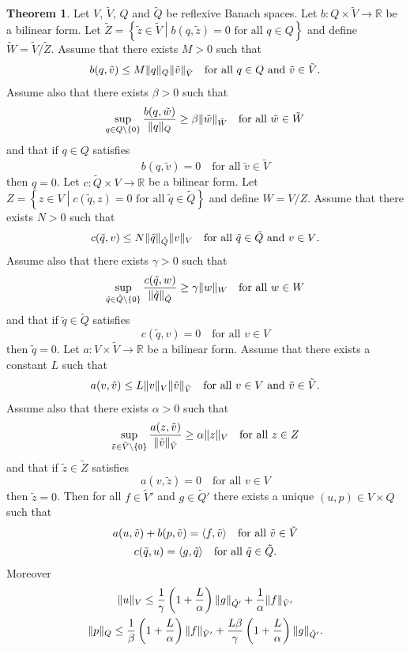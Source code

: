\documentclass[a4paper,10pt,oneside]{amsbook}
\numberwithin{section}{chapter}
\numberwithin{equation}{chapter}
\theoremstyle{definition}
\newtheorem{thm}[prop]{Theorem}
\DeclarePairedDelimiter{\norm}{\lVert}{\rVert}
\DeclarePairedDelimiter{\dual}{\langle}{\rangle}
\begin{document}
\begin{thm}
\label{thm:mixed-elliptic}
Let $V$, $\tilde V$, $Q$ and $\tilde Q$ be reflexive Banach spaces. Let $b\colon Q\times\tilde V\to\mathbb{R}$ be a bilinear form. Let $\tilde{Z}=\left\{\tilde{z}\in\tilde V\middle|\text{$b(q,\tilde z)=0$ for all $q\in Q$}\right\}$ and define $\tilde W=\tilde V/\tilde Z$. Assume that there exists $M>0$ such that
\[
b(q,\tilde v)\le M\norm{q}_Q\norm{\tilde v}_{\tilde V}\quad\text{for all $q\in Q$ and $\tilde v\in\tilde V$}.
\]
Assume also that there exists $\beta>0$ such that
\[
\sup_{q\in Q\setminus\{0\}}\frac{b(q,\tilde w)}{\norm{q}_Q}\ge\beta\norm{\tilde w}_{\tilde W}\quad\text{for all $\tilde w\in\tilde W$}
\]
and that if $q\in Q$ satisfies
\[
b(q,\tilde v)=0\quad\text{for all $\tilde v\in\tilde V$}
\]
then $q=0$. Let $c\colon\tilde Q\times V\to\mathbb{R}$ be a bilinear form. Let $Z=\left\{z\in V\middle|\text{$c(\tilde q,z)=0$ for all $\tilde q\in\tilde Q$}\right\}$ and define $W=V/Z$. Assume that there exists $N>0$ such that
\[
c(\tilde q,v)\le N\norm{\tilde q}_{\tilde Q}\norm{v}_{V}\quad\text{for all $\tilde q\in\tilde Q$ and $v\in V$}.
\]
Assume also that there exists $\gamma>0$ such that
\[
\sup_{\tilde q\in \tilde Q\setminus\{0\}}\frac{c(\tilde q,w)}{\norm{\tilde q}_{\tilde Q}}\ge\gamma\norm{w}_{W}\quad\text{for all $w\in W$}
\]
and that if $\tilde q\in\tilde Q$ satisfies
\[
c(\tilde q,v)=0\quad\text{for all $v\in V$}
\]
then $\tilde q=0$. Let $a\colon V\times\tilde V\to\mathbb{R}$ be a bilinear form. Assume that there exists a constant $L$ such that
\[
a(v,\tilde v)\le L\norm{v}_V\norm{\tilde v}_{\tilde V}\quad\text{for all $v\in V$ and $\tilde v\in\tilde V$}.
\]
Assume also that there exists $\alpha>0$ such that
\[
\sup_{\tilde v\in\tilde V\setminus\{0\}}\frac{a(z,\tilde v)}{\norm{\tilde v}_{\tilde V}}\ge\alpha\norm{z}_V\quad\text{for all $z\in Z$}
\]
and that if $\tilde z\in\tilde Z$ satisfies
\[
a(v,\tilde z)=0\quad\text{for all $v\in V$}
\]
then $\tilde z=0$. Then for all $f\in\tilde V'$ and $g\in\tilde Q'$ there exists a unique $(u,p)\in V\times Q$ such that
\begin{gather*}
a(u,\tilde v)+b(p,\tilde v)=\dual{f,\tilde v}\quad\text{for all $\tilde v\in\tilde V$} \\
c(\tilde q,u)=\dual{g,\tilde q}\quad\text{for all $\tilde q\in\tilde Q$}.
\end{gather*}
Moreover
\begin{gather*}
\norm{u}_V\le\frac{1}{\gamma}\left(1+\frac{L}{\alpha}\right)\norm{g}_{\tilde Q'}+\frac{1}{\alpha}\norm{f}_{\tilde V'} \\
\norm{p}_Q\le\frac{1}{\beta}\left(1+\frac{L}{\alpha}\right)\norm{f}_{\tilde V'}+\frac{L\beta}{\gamma}\left(1+\frac{L}{\alpha}\right)\norm{g}_{\tilde Q'}.
\end{gather*}
\end{thm}
\end{document}
